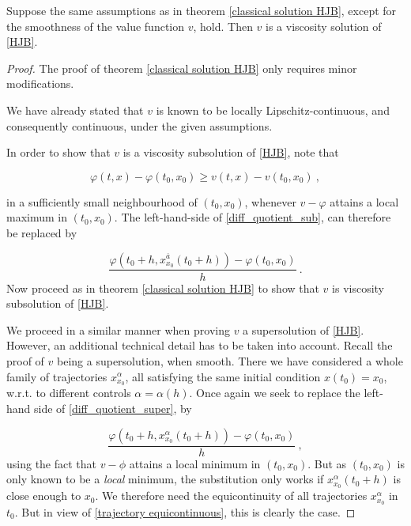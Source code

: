 	\begin{theorem}
		\label{viscosity solution HJB}
		Suppose the same assumptions as in theorem \ref{classical solution HJB}, except for the smoothness of the value function $ v $, hold. Then $ v $ is a viscosity solution of \ref{HJB}.
		
		\begin{proof}
			The proof of theorem \ref{classical solution HJB} only requires minor modifications.
			
			We have already stated that $ v $ is known to be locally Lipschitz-continuous, and consequently continuous, under the given assumptions.
			
			In order to show that $ v $ is a viscosity subsolution of \ref{HJB}, note that
			
			\begin{equation*}
				\varphi(t, x) - \varphi(t_0, x_0) \geq v(t, x) - v(t_0, x_0) \ ,
			\end{equation*}
			
			in a sufficiently small neighbourhood of $ (t_0, x_0) $, whenever $ v - \varphi $ attains a local maximum in $ (t_0, x_0) $.
			The left-hand-side of \ref{diff_quotient_sub}, can therefore be replaced by
			
			\begin{equation*}
				\frac{\varphi(t_0 + h, x^{\overline{a}}_{x_0}(t_0 + h)) - \varphi(t_0, x_0)}{h} \ .
			\end{equation*}
			Now proceed as in theorem \ref{classical solution HJB} to show that $ v $ is viscosity subsolution of \ref{HJB}.
			
			We proceed in a similar manner when proving $ v $ a supersolution of \ref{HJB}. However, an additional technical detail has to be taken into account. Recall the proof of $ v $ being a supersolution, when smooth. There we have considered a whole family of trajectories $ x_{x_0}^{\alpha} $, all satisfying the same initial condition $ x(t_0) = x_0 $, w.r.t. to different controls $ \alpha = \alpha(h) $. Once again we seek to replace the left-hand side of \eqref{diff_quotient_super}, by

			\begin{equation*}
				\frac{\varphi(t_0 + h, x^{\alpha}_{x_0}(t_0 + h)) - \varphi(t_0, x_0)}{h} \ ,
			\end{equation*}
			using the fact that $ v - \phi $ attains a local minimum in $ (t_0, x_0) $.
			But as $ (t_0, x_0) $ is only known to be a \emph{local} minimum, the substitution only works if $ x^{\alpha}_{x_0}(t_0 + h) $ is close enough to $ x_0 $. We therefore need the equicontinuity of all trajectories $ x^{\alpha}_{x_0} $ in $ t_0 $. But in view of \eqref{trajectory equicontinuous}, this is clearly the case.
		\end{proof}
	\end{theorem}


